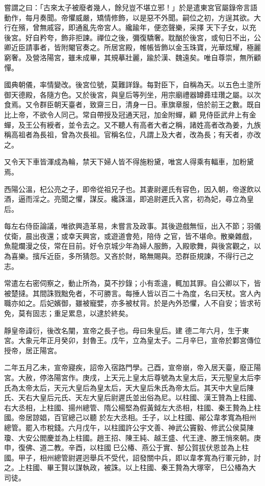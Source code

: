 \begin{pinyinscope}
 嘗謂之曰：「古來太子被廢者幾人，餘兒豈不堪立邪！」於是遣東宮官屬錄帝言語動作，每月奏聞。帝懼威嚴，矯情修飾，以是惡不外聞。嗣位之初，方逞其欲。大行在殯，曾無戚容，即通亂先帝宮人。纔踰年，便恣聲樂，采擇
 天下子女，以充後宮。好自矜夸，飾非拒諫。禪位之後，彌復驕奢。耽酗於後宮，或旬日不出，公卿近臣請事者，皆附閹官奏之。所居宮殿，帷帳皆飾以金玉珠寶，光華炫耀，極麗窮奢。及營洛陽宮，雖未成畢，其規摹壯麗，踰於漢、魏遠矣。唯自尊崇，無所顧憚。



 國典朝儀，率情變改。後宮位號，莫難詳錄。每對臣下，自稱為天。以五色土塗所御天德殿，各隨方色。又於後宮，與皇后等列坐，用宗廟禮器罇彞珪瓚之屬。以次食焉。又令群臣朝天臺者，致齋三日，清身一日。車旗章服，倍於前王之數。既自比上帝，不欲令人同己。常自帶授及冠通天冠，加金附蟬，顧
 見侍臣武弁上有金蟬，及王公有綬者，並令去之。又不聽人有高者大者之稱，諸姓高者改為姜，九族稱高祖者為長祖，曾為次長祖。官稱名位，凡謂上及大者，改為長；有天者，亦改之。



 又令天下車皆渾成為輪，禁天下婦人皆不得施粉黛，唯宮人得乘有輻車，加粉黛焉。



 西陽公溫，杞公亮之子，即帝從祖兄子也。其妻尉遲氏有容色，因入朝，帝遂飲以酒，逼而淫之。亮聞之懼，謀反。纔誅溫，即追尉遲氏入宮，初為妃，尋立為皇后。



 每左右侍臣論議，唯欲興造革易，未嘗言及政事。其後遊戲無恒，出入不節；羽儀仗衛，晨出夜還；或幸天興宮，或遊道會苑，陪侍
 之官，皆不堪命。散樂雜戲，魚龍爛漫之伎，常在目前。好令京城少年為婦人服飾，入殿歌舞，與後宮觀之，以為喜樂。擯斥近臣，多所猜怨。又吝於財，略無賜與。恐群臣規諫，不得行己之志。



 常遣左右密伺察之，動止所為，莫不抄錄；小有乖違，輒加其罪。自公卿以下，皆被楚撻。其間誅戮黜免者，不可勝言。每捶人皆以百二十為度，名曰天杖。宮人內職亦如之。后妃嬪御，雖被寵嬖，亦多被杖背。於是內外恐懼，人不自安；皆求茍免，莫有固志；重足累息，以逮於終矣。



 靜皇帝諱衍，後改名闡，宣帝之長子也。母曰朱皇后。建
 德二年六月，生于東宮。大象元年正月癸卯，封魯王。戊午，立為皇太子。二月辛巳，宣帝於鄴宮傳位授帝，居正陽宮。



 二年五月乙未，宣帝寢疾，詔帝入宿路門學。己酉，宣帝崩，帝入居天臺，廢正陽宮。大赦，停洛陽宮作。庚戌，上天元上皇太后尊號為太皇太后，天元聖皇太后李氏為太帝太后，天元大皇后為皇太后，天大皇后朱氏為帝太后。其天中大皇后陳氏、天右大皇后元氏、天左大皇后尉遲氏並出俗為尼。以柱國、漢王贊為上柱國、右大丞相，上柱國、揚州總管、隋公楊堅為假黃鉞左大丞相，柱國、秦王贄為上柱國。帝居諒娼，百官總己以聽
 於左大丞相。壬子，以上柱國、鄖公韋孝寬為相州總管。罷入市稅錢。六月戊午，以柱國許公宇文善、神武公竇毅、修武公侯莫陳瓊、大安公閻慶並為上柱國。趙王招、陳王純、越王盛、代王達、滕王悄來朝。庚申，復佛、道二教。辛酉，以柱國巳公椿、燕公于實、郜公賀拔伏恩並為上柱國。甲子，相州總管尉遲迥舉兵不受代，詔發關中兵，即以韋孝寬為行軍元帥，討之。上柱國、畢王賢以謀執政，被誅。以上柱國、秦王贄為大塚宰，巳公椿為大司徒。




\end{pinyinscope}
